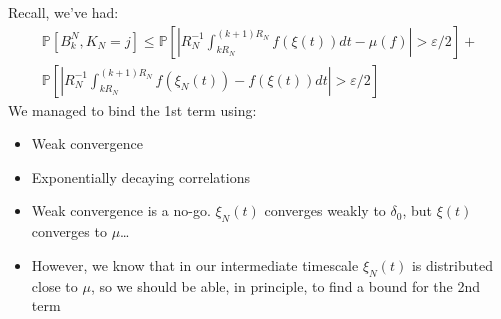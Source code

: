 \documentclass{beamer}
\begin{document}
\begin{frame}
    Recall, we've had:
    \begin{gather*}
        \mathbb{P}\left[ B^N_k, K_{N} = j \right] \leq \mathbb{P}\left[\left|R_N^{-1}\int_{kR_N}^{(k+1)R_N}f(\xi(t))dt - \mu(f)\right| > \varepsilon/2 \right] + \\
        \mathbb{P}\left[\left|R_N^{-1}\int_{kR_N}^{(k+1)R_N}f(\xi_N(t)) - f(\xi(t))dt \right| > \varepsilon/2\right]
    \end{gather*}
    We managed to bind the 1st term using:
    \begin{itemize}
        \item Weak convergence
        \item Exponentially decaying correlations
    \end{itemize}

    \begin{itemize}
        \item<3-> Weak convergence is a no-go. $\xi_N(t)$ converges weakly to $\delta_0$, but $\xi(t)$ converges to $\mu$\dots
        \item<4-> However, we know that in our intermediate timescale $\xi_N(t)$ is distributed close to $\mu$, so we should be able, in principle, to find a bound for the 2nd term 
    \end{itemize}
\end{frame}
\end{document}
